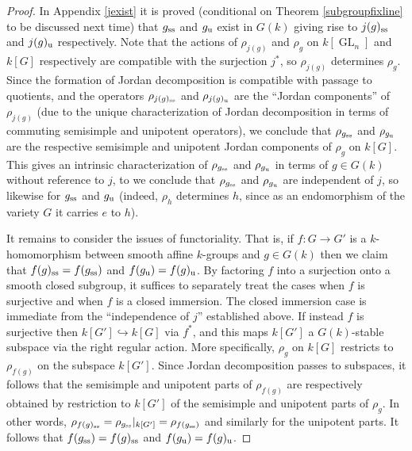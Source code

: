 \documentclass[10pt]{article}
\newcommand{\GL}{\operatorname{GL}}
\renewcommand{\(}{\left(}
\renewcommand{\)}{\right)}
\numberwithin{thm}{subsection}
\begin{document}
\begin{proof}
In Appendix \ref{jexist} it is proved 
(conditional on Theorem \ref{subgroupfixline} to be discussed next time) that
$g_{\rm{ss}}$ and $g_{\rm{u}}$ exist in $G(k)$ giving rise to $j(g)_{\rm{ss}}$ and $j(g)_{\rm{u}}$ respectively.
Note that the actions of $\rho_{j(g)}$ and $\rho_g$
on $k[\GL_n]$ and $k[G]$ respectively
are compatible with the surjection $j^*$, 
so $\rho_{j(g)}$ determines $\rho_g$.
Since the formation of Jordan decomposition is compatible with passage to quotients,
and the operators $\rho_{j(g)_{\rm{ss}}}$ and $\rho_{j(g)_{\rm{u}}}$ are the ``Jordan components''
of $\rho_{j(g)}$ (due to the unique characterization of Jordan decomposition
in terms of commuting semisimple and unipotent operators), we conclude
that $\rho_{g_{\rm{ss}}}$ and $\rho_{g_{\rm{u}}}$ are the respective
semisimple and unipotent Jordan components of $\rho_g$ on $k[G]$.
This gives an intrinsic characterization of $\rho_{g_{\rm{ss}}}$ and $\rho_{g_{\rm{u}}}$
in terms of $g \in G(k)$ without reference to $j$, to we conclude that
$\rho_{g_{\rm{ss}}}$ and $\rho_{g_{\rm{u}}}$ are independent of $j$,
so likewise for $g_{\rm{ss}}$ and $g_{\rm{u}}$ (indeed, $\rho_h$ determines $h$, since
as an endomorphism of the variety $G$ it carries $e$ to $h$).

It remains to consider the issues of functoriality.  That is, if
$f:G \rightarrow G'$ is a $k$-homomorphism between smooth affine $k$-groups
and $g \in G(k)$ then we claim that $f(g)_{\rm{ss}} = f(g_{\rm{ss}})$
and $f(g_{\rm{u}}) = f(g)_{\rm{u}}$.   By factoring $f$ into a surjection onto
a smooth closed subgroup, it suffices to separately treat the cases
when $f$ is surjective and when $f$ is a closed immersion.
The closed immersion case is immediate from the ``independence of $j$''
established above.  If instead $f$ is surjective then $k[G'] \hookrightarrow k[G]$ via
$f^{\ast}$, and this maps $k[G']$ a $G(k)$-stable subspace
via the right regular action.  More specifically,
$\rho_g$ on $k[G]$ restricts to $\rho_{f(g)}$ on the subspace $k[G']$.
Since Jordan decomposition passes to subspaces, it follows
that the semisimple and unipotent parts of $\rho_{f(g)}$ are respectively
obtained by restriction to $k[G']$ of the semisimple and unipotent parts of $\rho_g$.
In other words, $\rho_{f(g)_{\rm{ss}}} = \rho_{g_{\rm{ss}}}|_{k[G']} = \rho_{f(g_{\rm{ss}})}$
and similarly for the unipotent parts.  It follows that
$f(g_{\rm{ss}}) = f(g)_{\rm{ss}}$ and $f(g_{\rm{u}}) = f(g)_{\rm{u}}$.
\end{proof}
\end{document}
